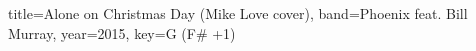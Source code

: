\documentclass{bekki-leadsheet}
\begin{document}
\begin{song}[transpose=1]{title={Alone on Christmas Day (Mike Love cover)}, band={Phoenix feat. Bill Murray}, year={2015}, key={G (F# +1)}}



\end{song}
\end{document}
